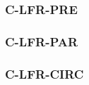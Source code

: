 \begin{paracol}{2}
\linenumbers
\switchcolumn

\subsubsection{C-LFR-PRE}


\subsubsection{C-LFR-PAR}


\subsubsection{C-LFR-CIRC}





\end{paracol}

